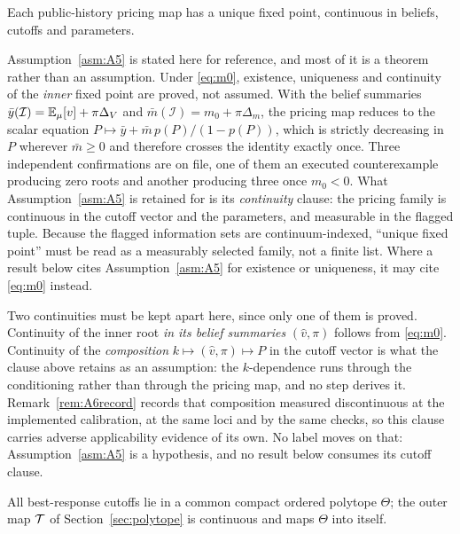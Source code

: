 \begin{assumption}
\label{asm:A5}
Each public-history pricing map has a unique fixed point, continuous in beliefs, cutoffs and
parameters.
\end{assumption}

Assumption~\ref{asm:A5} is stated here for reference, and most of it is a theorem rather than an
assumption. Under \eqref{eq:m0}, existence, uniqueness and continuity of the \emph{inner} fixed point
are proved, not assumed. With the belief summaries $\bar y(\mathcal I) = \mathbb{E}_\mu[v] + \pi\Delta_V$
and $\bar m(\mathcal I) = m_0 + \pi\Delta_m$, the pricing map reduces to the scalar equation
$P \mapsto \bar y + \bar m\,p(P)/(1-p(P))$, which is strictly decreasing in $P$ wherever
$\bar m \ge 0$ and therefore crosses the identity exactly once. Three independent confirmations are
on file, one of them an executed counterexample producing zero roots and another producing three
once $m_0 < 0$. What Assumption~\ref{asm:A5} is retained for is its \emph{continuity} clause: the
pricing family is continuous in the cutoff vector and the parameters, and measurable in the flagged
tuple. Because the flagged information sets are continuum-indexed, ``unique fixed point'' must be
read as a measurably selected family, not a finite list. Where a result below cites
Assumption~\ref{asm:A5} for existence or uniqueness, it may cite \eqref{eq:m0} instead.

Two continuities must be kept apart here, since only one of them is proved. Continuity of the inner
root \emph{in its belief summaries} $(\hat v,\pi)$ follows from \eqref{eq:m0}. Continuity of the
\emph{composition} $k \mapsto (\hat v,\pi) \mapsto P$ in the cutoff vector is what the clause above
retains as an assumption: the $k$-dependence runs through the conditioning rather than through the
pricing map, and no step derives it. Remark~\ref{rem:A6record} records that composition measured
discontinuous at the implemented calibration, at the same loci and by the same checks, so this
clause carries adverse applicability evidence of its own. No label moves on that:
Assumption~\ref{asm:A5} is a hypothesis, and no result below consumes its cutoff clause.

\begin{assumption}
\label{asm:A6}
All best-response cutoffs lie in a common compact ordered polytope $\Theta$; the outer map $\mathcal{T}$
of Section~\ref{sec:polytope} is continuous and maps $\Theta$ into itself.
\end{assumption}


